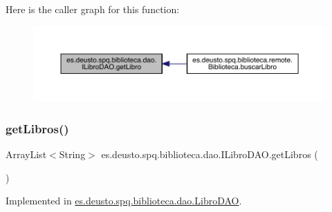 Here is the caller graph for this function\+:
\nopagebreak
\begin{figure}[H]
\begin{center}
\leavevmode
\includegraphics[width=350pt]{interfacees_1_1deusto_1_1spq_1_1biblioteca_1_1dao_1_1_i_libro_d_a_o_a1406f445c6462b6ef7a6d53422650f20_icgraph}
\end{center}
\end{figure}
\mbox{\label{interfacees_1_1deusto_1_1spq_1_1biblioteca_1_1dao_1_1_i_libro_d_a_o_ad8d7e48cb052174072938ca00ace7fea}} 
\subsubsection{\texorpdfstring{get\+Libros()}{getLibros()}}
{\footnotesize\ttfamily Array\+List$<$String$>$ es.\+deusto.\+spq.\+biblioteca.\+dao.\+I\+Libro\+D\+A\+O.\+get\+Libros (\begin{DoxyParamCaption}{ }\end{DoxyParamCaption})}



Implemented in \mbox{\hyperlink{classes_1_1deusto_1_1spq_1_1biblioteca_1_1dao_1_1_libro_d_a_o_a4af7e01dd7de88e84de3ce7084fcb37a}{es.\+deusto.\+spq.\+biblioteca.\+dao.\+Libro\+D\+AO}}.

